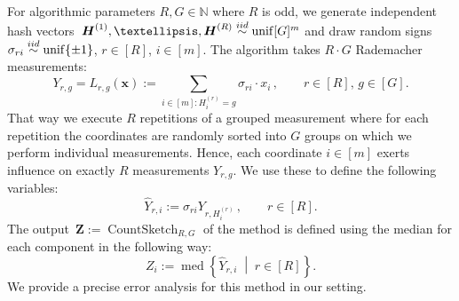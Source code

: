 \documentclass[12pt]{article}
\theoremstyle{plain}
\theoremstyle{definition}
\DeclareMathOperator{\Uniform}{unif}
\newcommand{\iid}{\stackrel{\textup{iid}}{\sim}}
\DeclareMathOperator{\median}{med}
\renewcommand{\vec}{\boldsymbol}
\newcommand{\N}{{\mathbb N}}
\DeclareMathOperator{\countsketch}{CountSketch}
\begin{document}
For algorithmic parameters $R,G \in \N$ where $R$ is odd,
we generate independent hash vectors~$\vec{H}^{(1)},\ldots,\vec{H}^{(R)} \iid \Uniform[G]^m$
and draw random signs
\mbox{$\sigma_{ri} \iid \Uniform\{\pm1\}$}, \mbox{$r \in [R]$}, \mbox{$i \in [m]$}.
The algorithm takes $R \cdot G$ Rademacher measurements:
\begin{equation*}
    Y_{r,g} = L_{r,g}(\vec{x}) := \sum_{i \in [m] \colon H_i^{(r)} = g} \sigma_{ri} \cdot x_i
    \,,
    \qquad r \in [R],\, g \in [G].
\end{equation*}
That way we execute
$R$ repetitions of a grouped measurement where for each repetition the coordinates are 
randomly sorted into $G$ groups on which we perform individual measurements.
Hence, each coordinate $i \in [m]$ exerts influence on exactly $R$ measurements $Y_{r,g}$.
We use these to define the following variables:
\begin{equation*}
    \hat{Y}_{r,i} := \sigma_{ri} Y_{r,H_i^{(r)}} \,, \qquad r \in [R].
\end{equation*}
The output~$\vec{Z} := \countsketch_{R,G}$ of the method is defined using the median for each component in the following way:
\begin{equation*}
    Z_i := \median \left\{\hat{Y}_{r,i} \;\middle|\; r \in [R] \right\}.
\end{equation*}
We provide a precise
error analysis for this method in our setting.
\end{document}
